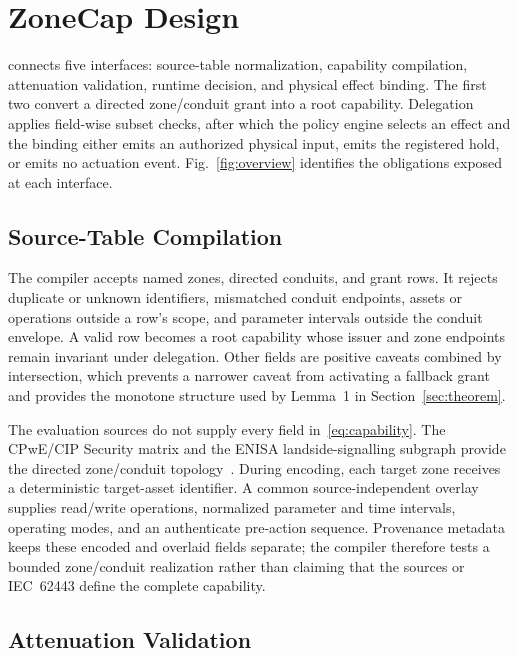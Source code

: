 \section{ZoneCap Design}
\label{sec:design}

\zonecap{} connects five interfaces: source-table normalization, capability compilation, attenuation validation, runtime decision, and physical effect binding. The first two convert a directed zone/conduit grant into a root capability. Delegation applies field-wise subset checks, after which the policy engine selects an effect and the binding either emits an authorized physical input, emits the registered hold, or emits no actuation event. Fig.~\ref{fig:overview} identifies the obligations exposed at each interface.

\subsection{Source-Table Compilation}

The compiler accepts named zones, directed conduits, and grant rows. It rejects duplicate or unknown identifiers, mismatched conduit endpoints, assets or operations outside a row's scope, and parameter intervals outside the conduit envelope. A valid row becomes a root capability whose issuer and zone endpoints remain invariant under delegation. Other fields are positive caveats combined by intersection, which prevents a narrower caveat from activating a fallback grant and provides the monotone structure used by Lemma~1 in Section~\ref{sec:theorem}.

The evaluation sources do not supply every field in~\eqref{eq:capability}. The CPwE/CIP Security matrix and the ENISA landside-signalling subgraph provide the directed zone/conduit topology~\cite{cpwe2020,enisa2022}. During encoding, each target zone receives a deterministic target-asset identifier. A common source-independent overlay supplies read/write operations, normalized parameter and time intervals, operating modes, and an authenticate pre-action sequence. Provenance metadata keeps these encoded and overlaid fields separate; the compiler therefore tests a bounded zone/conduit realization rather than claiming that the sources or IEC~62443 define the complete capability.

\subsection{Attenuation Validation}


